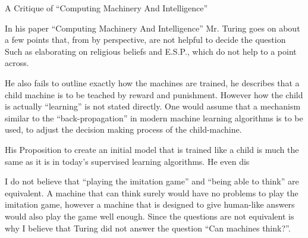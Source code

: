\documentclass[12pt,a4paper]{article}
\author{Jonas Harlacher}
\begin{document}
{
\begin{center}
\begin{Large}
A Critique of ``Computing Machinery And Intelligence''
\end{Large}
\end{center}
In his paper ``Computing Machinery And Intelligence'' Mr. Turing goes on about a few points that, from by perspective, are not helpful to decide the question
Such as elaborating on religious beliefs and E.S.P., which do not help to a point across.

He also fails to outline exactly how the machines are trained, he describes that a child machine is to be teached by reward and punishment.
However how the child is actually ``learning'' is not stated directly.
One would assume that a mechanism similar to the ``back-propagation'' in modern machine learning algorithms is to be used, to adjust the decision making process of the child-machine.

His Proposition to create an initial model that is trained like a child is much the same as it is in today's supervised learning algorithms.
He even dis

I do not believe that ``playing the imitation game'' and ``being able to think'' are equivalent. A machine that can think surely would have no problems to play the imitation game, however a machine that is designed to give human-like answers would also play the game well enough.
Since the questions are not equivalent is why I believe that Turing did not answer the question ``Can machines think?''.




}
\end{document}
